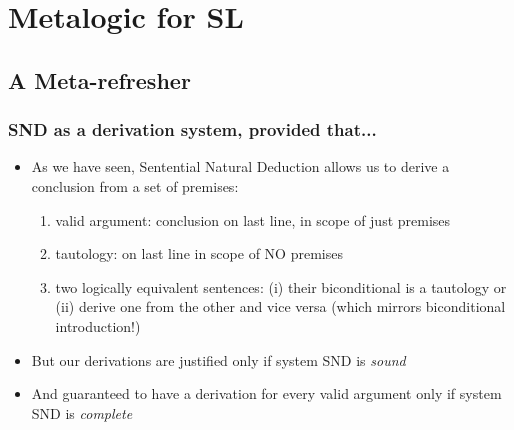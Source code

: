 ﻿%

\setcounter{section}{11}
\section{Metalogic for SL}

\begin{frame}

\scriptsize{\tableofcontents}

\end{frame}

\subsection{A Meta-refresher}

\begin{frame}
\frametitle{SND as a derivation system, provided that...}

\begin{itemize}[<+->]

\item As we have seen, Sentential Natural Deduction allows us to derive a conclusion from a set of premises:



\begin{enumerate}[1.)]

\item valid argument: conclusion on last line, in scope of just premises %

\item tautology: on last line in scope of NO premises %

\item two logically equivalent sentences: (i) their biconditional is a tautology or (ii) derive one from the other and vice versa (which mirrors biconditional introduction!)

\end{enumerate}

\item But our derivations are justified only if system SND is \textit{sound}

\item And guaranteed to have a derivation for every valid argument only if system SND is \textit{complete}




\end{itemize}
\end{frame}

